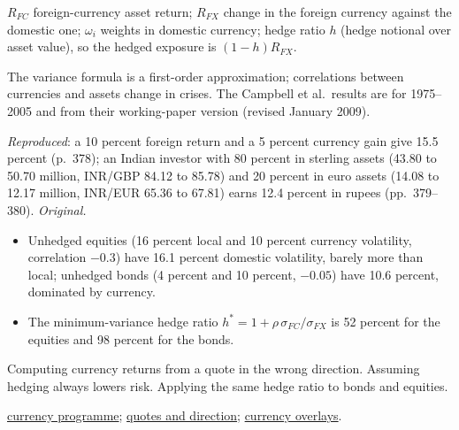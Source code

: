 \begin{qfmethod}
 $R_{FC}$ foreign-currency asset return; $R_{FX}$ change in the foreign currency against the domestic one; $\omega_i$ weights in domestic currency; hedge ratio $h$ (hedge notional over asset value), so the hedged exposure is $(1-h)R_{FX}$.

 The variance formula is a first-order approximation; correlations between currencies and assets change in crises. The Campbell et al.\ results are for 1975--2005 and from their working-paper version (revised January 2009).

 \emph{Reproduced}: a 10 percent foreign return and a 5 percent currency gain give 15.5 percent (p.~378); an Indian investor with 80 percent in sterling assets (43.80 to 50.70 million, INR/GBP 84.12 to 85.78) and 20 percent in euro assets (14.08 to 12.17 million, INR/EUR 65.36 to 67.81) earns 12.4 percent in rupees (pp.~379--380). \emph{Original.}
\begin{itemize}
\item Unhedged equities (16 percent local and 10 percent currency volatility, correlation $-0.3$) have 16.1 percent domestic volatility, barely more than local; unhedged bonds (4 percent and 10 percent, $-0.05$) have 10.6 percent, dominated by currency.
\item The minimum-variance hedge ratio $h^*=1+\rho\,\sigma_{FC}/\sigma_{FX}$ is 52 percent for the equities and 98 percent for the bonds.
\end{itemize}

 Computing currency returns from a quote in the wrong direction. Assuming hedging always lowers risk. Applying the same hedge ratio to bonds and equities.

 \hyperref[meth:currency-hedging-programme]{currency programme}; \hyperref[def:fx-market-real-exchange-rates]{quotes and direction}; \hyperref[meth:forward-commitment-risk-overlays]{currency overlays}.

\end{qfmethod}

